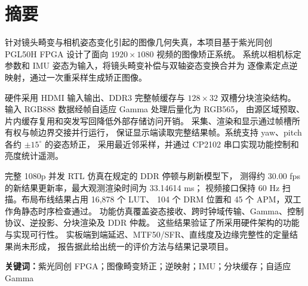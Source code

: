 \chapter*{摘要}
针对镜头畸变与相机姿态变化引起的图像几何失真，本项目基于紫光同创
PGL50H FPGA 设计了面向 $1920\times1080$ 视频的图像矫正系统。
系统以相机标定参数和 IMU 姿态为输入，将镜头畸变补偿与双轴姿态变换合并为
逐像素定点逆映射，通过一次重采样生成矫正图像。

硬件采用 HDMI 输入输出、DDR3 完整帧缓存与 $128\times32$ 双槽分块渲染结构。
输入 RGB888 数据经帧自适应 Gamma 处理后量化为 RGB565，
由源区域预取、片内缓存复用和突发写回降低外部存储访问开销。
采集、渲染和显示通过帧槽所有权与帧边界交接并行运行，
保证显示端读取完整结果帧。系统支持 yaw、pitch 各约 $\pm15^\circ$ 的姿态矫正，
采用最近邻采样，并通过 CP2102 串口实现功能控制和亮度统计遥测。

完整 1080p 并发 RTL 仿真在规定的 DDR 停顿与刷新模型下，
测得约 30.00 fps 的新结果更新率，最大观测渲染时间为 33.14614 ms；
视频接口保持 60 Hz 扫描。布局布线结果占用 16,878 个 LUT、
104 个 DRM 位置和 45 个 APM，双工作角静态时序检查通过。
功能仿真覆盖姿态接收、跨时钟域传输、Gamma、控制协议、逆投影、分块渲染及 DDR 仲裁。
这些结果验证了所采用硬件架构的功能与实现可行性。
实板端到端延迟、MTF50/SFR、直线度及边缘完整性的定量结果尚未形成，
报告据此给出统一的评价方法与结果记录项目。

\noindent\textbf{关键词：}紫光同创 FPGA；图像畸变矫正；逆映射；IMU；分块缓存；自适应 Gamma
